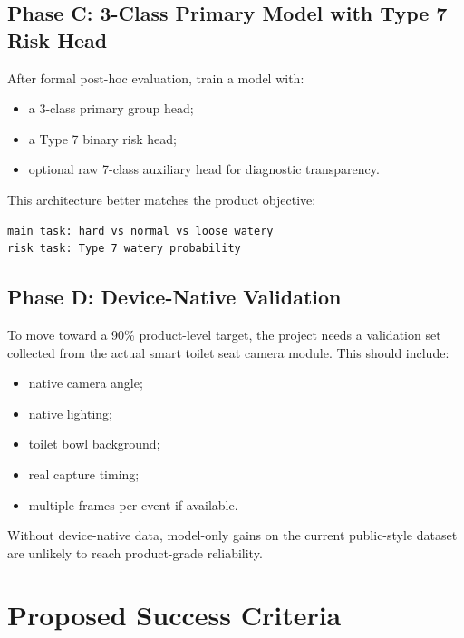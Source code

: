 \documentclass[11pt]{article}
\begin{document}
\subsection{Phase C: 3-Class Primary Model with Type 7 Risk Head}

After formal post-hoc evaluation, train a model with:

\begin{itemize}
    \item a 3-class primary group head;
    \item a Type 7 binary risk head;
    \item optional raw 7-class auxiliary head for diagnostic transparency.
\end{itemize}

This architecture better matches the product objective:

\begin{verbatim}
main task: hard vs normal vs loose_watery
risk task: Type 7 watery probability
\end{verbatim}

\subsection{Phase D: Device-Native Validation}

To move toward a 90\% product-level target, the project needs a validation set collected from the actual smart toilet seat camera module. This should include:

\begin{itemize}
    \item native camera angle;
    \item native lighting;
    \item toilet bowl background;
    \item real capture timing;
    \item multiple frames per event if available.
\end{itemize}

Without device-native data, model-only gains on the current public-style dataset are unlikely to reach product-grade reliability.

\section{Proposed Success Criteria}
\end{document}
